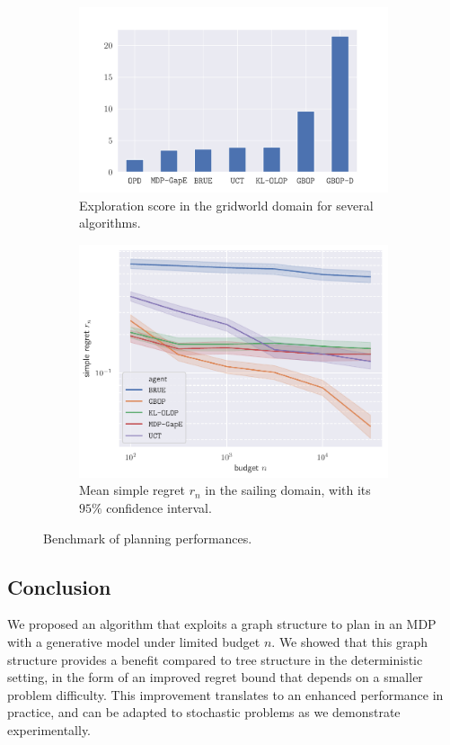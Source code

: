 \begin{figure}[ht]
	\centering
	\begin{subfigure}[b]{0.49\textwidth}
		\includegraphics[trim = {1.6cm 0.cm 2cm 1.5cm}, clip, width=\linewidth]{img/gbop/score.pdf}
		\caption{Exploration score in the gridworld domain for several algorithms.}
		\label{fig:exploration-score}
	\end{subfigure}
	\hfill%
	\begin{subfigure}[b]{0.49\textwidth}
		\includegraphics[trim = {0.2cm 0.2cm 0.7cm 0.5cm}, clip, width=\linewidth]{img/gbop/simple_regret.pdf}
		\caption{Mean simple regret $r_n$ in the sailing domain, with its $95\%$ confidence interval.}
		\label{fig:sailing}
	\end{subfigure}
	\caption{Benchmark of planning performances.}
\end{figure}

\subsection*{Conclusion}

We proposed an algorithm that exploits a graph structure to plan in an MDP with a generative model under limited budget $n$. We showed that this graph structure provides a benefit compared to tree structure in the deterministic setting, in the form of an improved regret bound that depends on a smaller problem difficulty. This improvement translates to an enhanced performance in practice, and can be adapted to stochastic problems as we demonstrate experimentally.